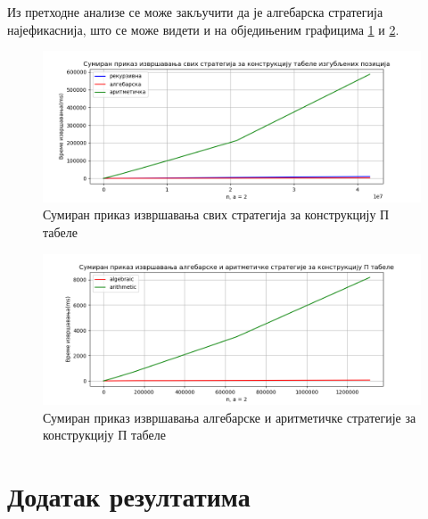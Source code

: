 \documentclass[a4paper]{article}
\begin{document}
Из претходне анализе се може закључити да је алгебарска стратегија најефикаснија, што се може видети и на обједињеним графицима \ref{fig:all} и  \ref{fig:algebraicVSarithmetic}.

\begin{figure}[H]
	\caption{Сумиран приказ извршавања свих стратегија за конструкцију П табеле}
	\label{fig:all}
	\begin{center}
		\includegraphics[width=\textwidth]{all.png}
	\end{center}
\end{figure}

\begin{figure}[H]
	\caption{Сумиран приказ извршавања алгебарске и аритметичке стратегије за конструкцију П табеле}
	\label{fig:algebraicVSarithmetic}
	\begin{center}
		\includegraphics[width=\textwidth]{algebraicVSarithmetic.png}
	\end{center}
\end{figure}

\appendix
\section{Додатак резултатима}



\appendix
 

\end{document}
